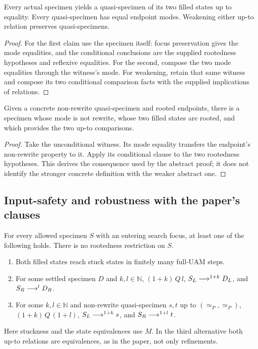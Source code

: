 \begin{lemma}
Every actual specimen yields a quasi-specimen of its two filled states up to
equality. Every quasi-specimen has equal endpoint modes. Weakening either
up-to relation preserves quasi-specimens.
\end{lemma}
\begin{proof}
For the first claim use the specimen itself: focus preservation gives the
mode equalities, and the conditional conclusions are the supplied rootedness
hypotheses and reflexive equalities. For the second, compose the two mode
equalities through the witness's mode. For weakening, retain that same
witness and compose its two conditional comparison facts with the supplied
implications of relations.
\end{proof}

\begin{lemma}
Given a concrete non-rewrite quasi-specimen and rooted endpoints, there is a
specimen whose mode is not rewrite, whose two filled states are rooted, and
which provides the two up-to comparisons.
\end{lemma}
\begin{proof}
Take the unconditional witness. Its mode equality transfers the endpoint's
non-rewrite property to it. Apply its conditional clause to the two rootedness
hypotheses. This derives the consequence used by the abstract proof; it does
not identify the stronger concrete definition with the weaker abstract one.
\end{proof}

\subsection{Input-safety and robustness with the paper's clauses}
\begin{definition}
For every allowed specimen $S$ with an entering search focus, at least one of
the following holds. There is no rootedness restriction on $S$.
\begin{enumerate}
\item Both filled states reach stuck states in finitely many full-UAM steps.
\item For some settled specimen $D$ and $k,l\in\mathbb N$,
$(1+k)\,Q\,l$, $S_L\mathrel{\longrightarrow^{1+k}}D_L$, and $S_R\mathrel{\longrightarrow^{l}}D_R$.
\item For some $k,l\in\mathbb N$ and non-rewrite quasi-specimen $s,t$ up to
$(\simeq_P,\simeq_P)$,
$(1+k)\,Q\,(1+l)$, $S_L\mathrel{\longrightarrow^{1+k}}s$, and $S_R\mathrel{\longrightarrow^{1+l}}t$.
\end{enumerate}
\end{definition}
Here stuckness and the state equivalences use $M$. In the third alternative
both up-to relations are equivalences, as in the paper, not only refinements.


